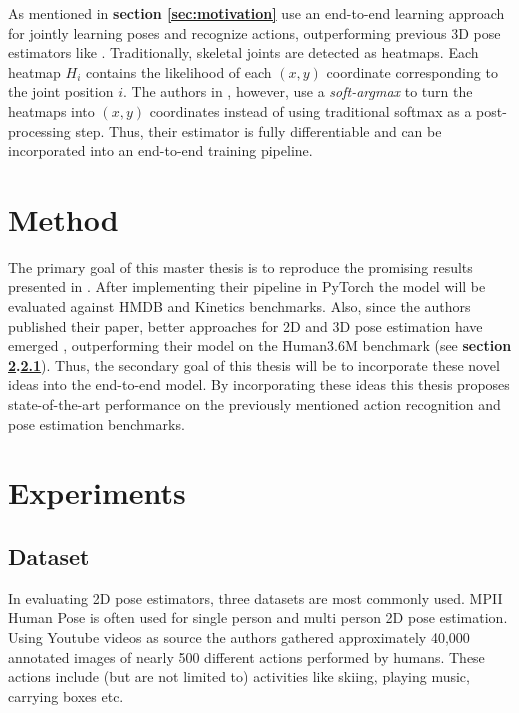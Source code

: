 \documentclass[twoside]{article}
\begin{document}
\begin{multicols}{2}
As mentioned in \textbf{section \ref{sec:motivation}} \cite{luvizon_2d/3d_2018} use an end-to-end learning approach for jointly learning poses and recognize actions, outperforming previous 3D pose estimators like \cite{martinez_simple_2017}.
Traditionally, skeletal joints are detected as heatmaps.
Each heatmap $H_i$ contains the likelihood of each $(x,y)$ coordinate corresponding to the joint position $i$.
The authors in \cite{luvizon_2d/3d_2018}, however, use a \textit{soft-argmax}\cite{luvizon_human_2017} to turn the heatmaps into $(x,y)$ coordinates instead of using traditional softmax as a post-processing step.
Thus, their estimator is fully differentiable and can be incorporated into an end-to-end training pipeline.

\section{Method}

The primary goal of this master thesis is to reproduce the promising results presented in \cite{luvizon_2d/3d_2018}.
After implementing their pipeline in PyTorch \cite{paszke_automatic_2017} the model will be evaluated against HMDB \cite{kuehne_hmdb:_2011} and Kinetics \cite{kay_kinetics_2017} benchmarks.
Also, since the authors published their paper, better approaches for 2D and 3D pose estimation have emerged \cite{pavllo_3d_2019}, outperforming their model on the Human3.6M benchmark (see \textbf{section \ref{sec:experiment}.\ref{sec:dataset}}).
Thus, the secondary goal of this thesis will be to incorporate these novel ideas into the end-to-end model.
By incorporating these ideas this thesis proposes state-of-the-art performance on the previously mentioned action recognition and pose estimation benchmarks.

\section{Experiments}
\label{sec:experiment}
\subsection{Dataset}
\label{sec:dataset}

In evaluating 2D pose estimators, three datasets are most commonly used.
MPII Human Pose \cite{andriluka_2d_2014} is often used for single person and multi person 2D pose estimation.
Using Youtube videos as source the authors gathered approximately 40,000 annotated images of nearly 500 different actions performed by humans.
These actions include (but are not limited to) activities like skiing, playing music, carrying boxes etc.


\end{multicols}
\end{document}

